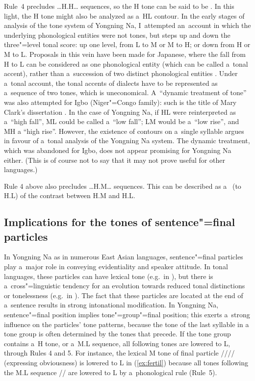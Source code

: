 Rule~4 precludes {\dots}H.H{\dots} sequences, so the H tone can be said to be . In this
light, the H tone might also be analyzed as a~HL contour. In the early stages of analysis of the tone system of Yongning Na, I~attempted an~account in which the underlying phonological entities were not tones, but steps up and down the three"=level tonal
score: up one level, from L to M or M to H; or down from H or M to L. Proposals
in this vein have been made for Japanese, where the fall from H to L can be considered as one phonological entity (which can be called a~tonal accent), rather than a~succession of two distinct phonological entities \citep[1399]{kubozono2012}. Under
a~tonal account, the tonal accents of  dialects have to be represented as a~sequence of two
tones, which is uneconomical. A~“dynamic treatment of tone” was also attempted for Igbo (Niger"=Congo family): such is the
title of Mary Clark’s dissertation \citep{clark1976}. In the case of Yongning Na, if HL were
reinterpreted as a~“high fall”, ML could be called a~“low fall”; LM would be a~“low rise”, and MH a
“high rise”. However, the existence of contours on a~single syllable argues in favour of a~tonal
analysis of the Yongning Na system. The dynamic treatment, which was abandoned for Igbo, does not
appear promising for Yongning Na either. (This is of course not to say that it may not prove useful
for other languages.)

Rule 4 above also precludes {\dots}H.M{\dots} sequences. This can be described as a~
(to H.L) of the contrast between H.M and H.L.


\subsection{Implications for the tones of sentence"=final particles}
\label{sec:implicationsforthetonesofsentenceparticles}

In Yongning Na as in numerous East Asian languages, sentence"=final particles play a~major role in
conveying evidentiality and speaker attitude. In tonal languages, these particles can have lexical tone (e.g.~in ), but there is a~cross"=linguistic tendency for an evolution towards reduced tonal distinctions or tonelessness (e.g.~in ). The fact that these particles are located at the end of a~sentence results in strong intonational modification. In Yongning Na, sentence"=final position implies tone"=group"=final position; this exerts a~strong influence on the particles' tone patterns, because the tone of the last syllable in a tone group is often determined by the tones that precede. If the tone group contains a~H tone, or a~M.L
sequence, all following tones are lowered to L, through Rules 4 and 5. For instance, the lexical M tone of
final particle //// (expressing obviousness) is lowered to L in (\ref{ex:fertil}) because all tones following the M.L
sequence // are lowered to L by a~{phonological rule} (Rule~5). 

